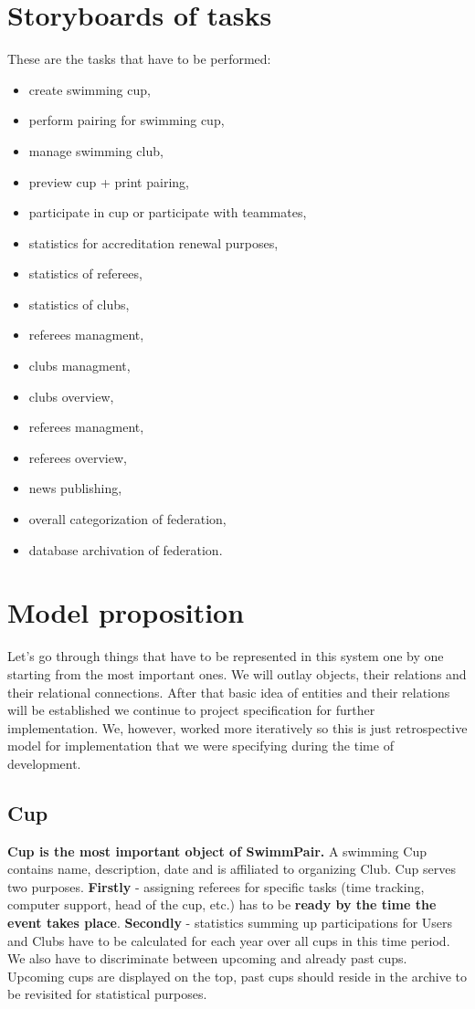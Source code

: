 \section{Storyboards of tasks}
These are the tasks that have to be performed:
\begin{itemize}
    \item create swimming cup,
    \item perform pairing for swimming cup,
    \item manage swimming club,
    \item preview cup + print pairing,
    \item participate in cup or participate with teammates,
    \item statistics for accreditation renewal purposes,
    \item statistics of referees,
    \item statistics of clubs,
    \item referees managment,
    \item clubs managment,
    \item clubs overview,
    \item referees managment,
    \item referees overview,
    \item news publishing,
    \item overall categorization of federation,
    \item database archivation of federation.
  \end{itemize}
\section{Model proposition}
Let's go through things that have to be represented in this system one by one starting from the most important ones. We will outlay  objects, their relations and their relational connections. After that basic idea of entities and their relations will be established we continue to project specification for further implementation. We, however, worked more iteratively so this is just retrospective model for implementation that we were specifying during the time of development. 
\par
\subsection*{Cup}
\textbf{Cup is the most important object of SwimmPair.} A swimming Cup contains name, description, date and is affiliated to organizing Club. Cup serves two purposes. \textbf{Firstly} - assigning referees for specific tasks (time tracking, computer support, head of the cup, etc.) has to be \textbf{ready by the time the event takes place}. \textbf{Secondly} - statistics summing up participations for Users and Clubs have to be calculated for each year over all cups in this time period. We also have to discriminate between upcoming and already past cups. Upcoming cups are displayed on the top, past cups should reside in the archive to be revisited for statistical purposes.
